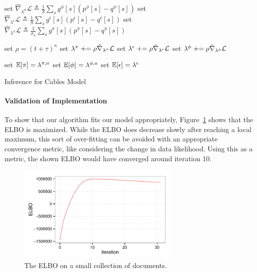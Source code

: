 \begin{algorithm}
{	

	
	set $\hat\nabla_{\lambda^{\phi} }\mathcal{L} \triangleq \frac{1}{S} \sum_s g^\phi[s] ( p^\phi[s] -  q^\phi[s] )$ \;
	set $\hat\nabla_{\lambda^{\epsilon}} \mathcal{L} \triangleq \frac{1}{S} \sum_s g^\epsilon[s] ( p^\epsilon[s] -  q^\epsilon[s] )$ \;
	set $\hat\nabla_{\lambda^{\pi}} \mathcal{L} \triangleq \frac{1}{\sigma_\pi} \sum_s g^\pi[s] ( p^\pi[s] -  q^\pi[s] )$ \;

	\BlankLine
	set $\rho= (t +\tau)^\kappa$ \;
	set $\lambda^{\pi} \mathrel{+}= \rho \hat\nabla_{\lambda^{\pi}} \mathcal{L}$ \;
	set $\lambda^{\epsilon} \mathrel{+}= \rho \hat\nabla_{\lambda^{\epsilon}} \mathcal{L}$ \;
	set $\lambda^{\phi} \mathrel{+}= \rho \hat\nabla_{\lambda^{\phi}} \mathcal{L}$ \;
}

set $\mathbb{E}[\pi] = \lambda^{\pi,a}$ \;
set $\mathbb{E}[\phi] = \lambda^{\phi,a}$ \;
set $\mathbb{E}[\epsilon] = \lambda^{\epsilon}$ \;
\BlankLine
\Return{$\E[\pi]$, $\E[\phi]$, $\E[\epsilon]$} \;
\caption{Inference for Cables Model}
\label{alg:cables}
\end{algorithm}

\paragraph{Validation of Implementation}
To show that our algorithm fits our model appropriately, Figure~\ref{fig:ELBO} shows that the ELBO is maximized.  While the ELBO does decrease slowly after reaching a local maximum, this sort of over-fitting can be avoided with an appropriate convergence metric, like considering the change in data likelihood. Using this as a metric, the shown ELBO would have converged around iteration 10.
\begin{figure}[ht]
\centering
\includegraphics[width=0.7\textwidth]{fig/ELBO.pdf}
\caption{The ELBO on a small collection of documents.}
\label{fig:ELBO}
\end{figure}



